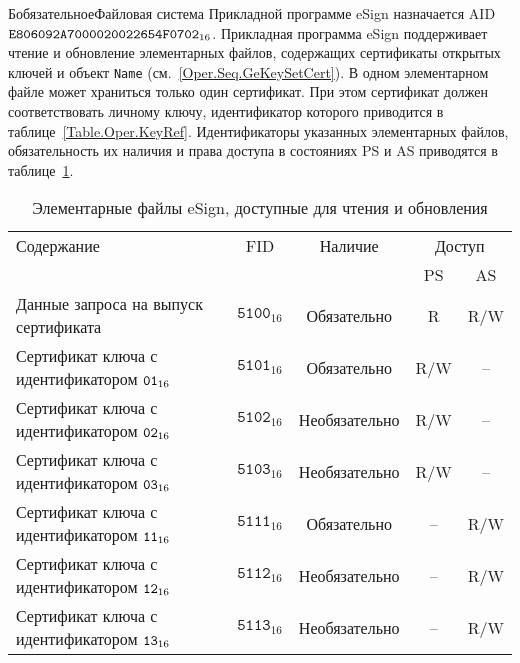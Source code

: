 \begin{appendix}{Б}{обязательное}{Файловая система}
Прикладной программе eSign назначается AID~$\texttt{E806092A7000020022654F0702}_{16}$. 
%
Прикладная программа eSign поддерживает чтение и обновление 
элементарных файлов, содержащих сертификаты открытых ключей и 
объект \texttt{Name} (см.~\ref{Oper.Seq.GeKeySetCert}). 
В одном элементарном файле может храниться только один
сертификат. При этом сертификат должен
соответствовать личному ключу, идентификатор которого приводится
в таблице~\ref{Table.Oper.KeyRef}.
Идентификаторы указанных элементарных файлов,
обязательность их наличия и права доступа 
в состояниях PS и AS приводятся в 
таблице~\ref{Table.FILES.EFSIGN}.
 

\begin{table}[H]
\caption{Элементарные файлы eSign, доступные для чтения и обновления}
\label{Table.FILES.EFSIGN}
\begin{tabular}{|l|c|c|c|c|}
\hline
Содержание & FID & Наличие & \multicolumn{2}{|c|}{Доступ}\\
\cline{4-5}
& & & PS & AS \\
\hline
\hline
Данные запроса на выпуск сертификата & 
$\texttt{5100}_{16}$ & Обязательно &  R & R/W \\
Сертификат ключа с идентификатором $\texttt{01}_{16}$ & 
$\texttt{5101}_{16}$ & Обязательно & R/W & -- \\
Сертификат ключа с идентификатором $\texttt{02}_{16}$ & 
$\texttt{5102}_{16}$ & Необязательно & R/W & -- \\
Сертификат ключа с идентификатором $\texttt{03}_{16}$ & 
$\texttt{5103}_{16}$ & Необязательно & R/W & -- \\
Сертификат ключа с идентификатором $\texttt{11}_{16}$ & 
$\texttt{5111}_{16}$ & Обязательно & -- & R/W \\
Сертификат ключа с идентификатором $\texttt{12}_{16}$ & 
$\texttt{5112}_{16}$ & Необязательно &  -- & R/W \\
Сертификат ключа с идентификатором $\texttt{13}_{16}$ & 
$\texttt{5113}_{16}$ & Необязательно & -- & R/W \\
\hline
\end{tabular}
\end{table}






\end{appendix}